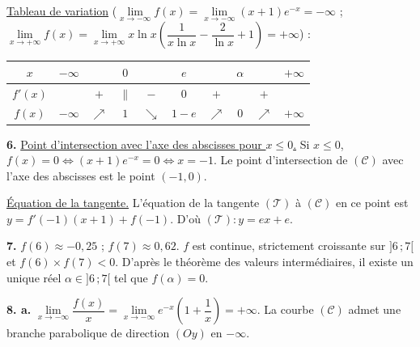 \documentclass[11pt]{article}
\begin{document}
\underline{Tableau de variation} ($\lim\limits_{x\to-\infty} f(x) = \lim\limits_{x\to-\infty}(x + 1)e^{-x} = -\infty$ ; $\lim\limits_{x\to+\infty} f(x) = \lim\limits_{x\to+\infty} x\ln x\left(\dfrac{1}{x\ln x} - \dfrac{2}{\ln x} + 1\right) = +\infty$) :
\begin{center}\renewcommand{\arraystretch}{1.4}
\begin{tabular}{|c|ccccccccc|}
\hline
$x$ & $-\infty$ & & $0$ & & $e$ & & $\alpha$ & & $+\infty$ \\
\hline
$f'(x)$ & & $+$ & $\|$ & $-$ & $0$ & $+$ & & $+$ & \\
\hline
$f(x)$ & $-\infty$ & $\nearrow$ & $1$ & $\searrow$ & $1 - e$ & $\nearrow$ & $0$ & $\nearrow$ & $+\infty$ \\
\hline
\end{tabular}
\end{center}

\textbf{6.} \underline{Point d'intersection avec l'axe des abscisses pour $x \le 0$.} Si $x \le 0$, $f(x) = 0 \Longleftrightarrow (x + 1)e^{-x} = 0 \Longleftrightarrow x = -1$. Le point d'intersection de $(\mathscr{C})$ avec l'axe des abscisses est le point $(-1, 0)$.

\underline{Équation de la tangente.} L'équation de la tangente $(\mathscr{T})$ à $(\mathscr{C})$ en ce point est $y = f'(-1)(x + 1) + f(-1)$. D'où $(\mathscr{T}) : y = ex + e$.

\textbf{7.} $f(6) \approx -0{,}25$ ; $f(7) \approx 0{,}62$. $f$ est continue, strictement croissante sur $]6\,;7[$ et $f(6) \times f(7) < 0$. D'après le théorème des valeurs intermédiaires, il existe un unique réel $\alpha \in ]6\,;7[$ tel que $f(\alpha) = 0$.

\textbf{8. a.} $\lim\limits_{x\to-\infty}\dfrac{f(x)}{x} = \lim\limits_{x\to-\infty} e^{-x}\left(1 + \dfrac{1}{x}\right) = +\infty$. La courbe $(\mathscr{C})$ admet une branche parabolique de direction $(Oy)$ en $-\infty$.
\end{document}
